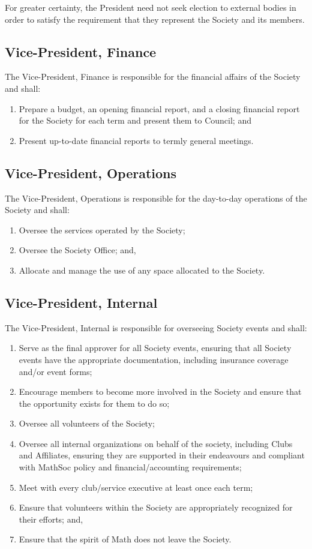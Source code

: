 For greater certainty, the President need not seek election to external bodies
in order to satisfy the requirement that they represent the Society and its
members.

\subsection{Vice-President, Finance}
The Vice-President, Finance is responsible for the financial affairs of the
Society and shall:
\begin{enumerate}
  \item Prepare a budget, an opening financial report, and a closing financial
    report for the Society for each term and present them to Council; and
  \item Present up-to-date financial reports to termly general meetings.
\end{enumerate}

\subsection{Vice-President, Operations}
The Vice-President, Operations is responsible for the day-to-day operations of
the Society and shall:
\begin{enumerate}
  \item Oversee the services operated by the Society;
  \item Oversee the Society Office; and,
  \item Allocate and manage the use of any space allocated to the Society.
\end{enumerate}

\subsection{Vice-President, Internal}
The Vice-President, Internal is responsible for overseeing Society events and
shall:
\begin{enumerate}
  \item Serve as the final approver for all Society events, ensuring that all
      Society events have the appropriate documentation, including insurance
      coverage and/or event forms;
  \item Encourage members to become more involved in the Society and ensure
      that the opportunity exists for them to do so;
  \item Oversee all volunteers of the Society;
  \item Oversee all internal organizations on behalf of the society, including
      Clubs and Affiliates, ensuring they are supported in their endeavours and
      compliant with MathSoc policy and financial/accounting requirements;
  \item Meet with every club/service executive at least once each term;
  \item Ensure that volunteers within the Society are appropriately recognized
      for their efforts; and,
  \item Ensure that the spirit of Math does not leave the Society.
\end{enumerate}

